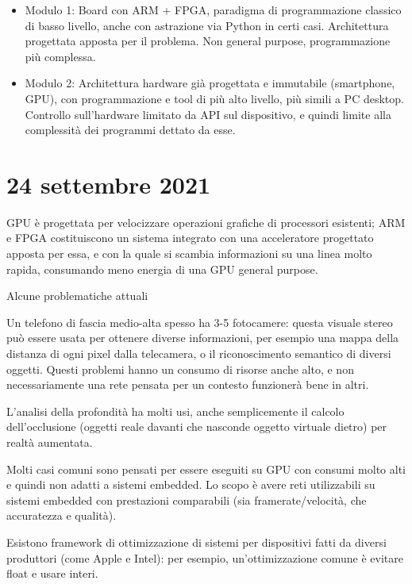 \documentclass[a4paper,oneside]{book}
\begin{document}
    \begin{itemize}
        \item Modulo 1: Board con ARM + FPGA, paradigma di programmazione classico di basso livello,
            anche con astrazione via Python in certi casi. Architettura progettata apposta per 
            il problema. Non general purpose, programmazione più complessa.
        \item Modulo 2: Architettura hardware già progettata e immutabile (smartphone, GPU), con programmazione
            e tool di più alto livello, più simili a PC desktop. Controllo sull'hardware limitato 
            da API sul dispositivo, e quindi limite alla complessità dei programmi dettato da esse.
    \end{itemize}

    \section{24 settembre 2021}

    GPU è progettata per velocizzare operazioni grafiche di processori esistenti; 
    ARM e FPGA costituiscono un sistema integrato con una acceleratore progettato 
    apposta per essa, e con la quale si scambia informazioni su una linea molto rapida, 
    consumando meno energia di una GPU general purpose.

    Alcune problematiche attuali

    Un telefono di fascia medio-alta spesso ha 3-5 fotocamere: questa visuale stereo può
    essere usata per ottenere diverse informazioni, per esempio una mappa della distanza 
    di ogni pixel dalla telecamera, o il riconoscimento semantico di diversi oggetti.
    Questi problemi hanno un consumo di risorse anche alto, e non necessariamente una rete 
    pensata per un contesto funzionerà bene in altri.

    L'analisi della profondità ha molti usi, anche semplicemente il calcolo dell'occlusione 
    (oggetti reale davanti che nasconde oggetto virtuale dietro) per realtà aumentata.

    Molti casi comuni sono pensati per essere eseguiti su GPU con consumi molto alti e
    quindi non adatti a sistemi embedded. Lo scopo è avere reti utilizzabili su sistemi 
    embedded con prestazioni comparabili (sia framerate/velocità, che accuratezza e qualità).

    Esistono framework di ottimizzazione di sistemi per dispositivi fatti da diversi 
    produttori (come Apple e Intel): per esempio, un'ottimizzazione comune è evitare 
    float e usare interi.
\end{document}
